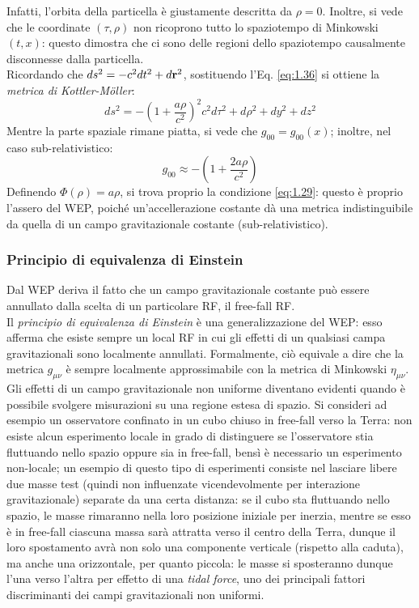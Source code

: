 Infatti, l'orbita della particella è giustamente descritta da $ \rho = 0 $. Inoltre, si vede che le coordinate $ (\tau,\rho) $ non ricoprono tutto lo spaziotempo di Minkowski $ (t,x) $: questo dimostra che ci sono delle regioni dello spaziotempo causalmente disconnesse dalla particella.\\
Ricordando che $ ds^2 = -c^2 dt^2 + d\mathbf{r}^2 $, sostituendo l'Eq. \ref{eq:1.36} si ottiene la \textit{metrica di Kottler-Möller}:
\begin{equation}
  ds^2 = - \left( 1 + \frac{a\rho}{c^2} \right)^2 c^2 d\tau^2 + d\rho^2 + dy^2 + dz^2
  \label{eq:1.37}
\end{equation}
Mentre la parte spaziale rimane piatta, si vede che $ g_{00} = g_{00} (x) $; inoltre, nel caso sub-relativistico:
\begin{equation}
  g_{00} \approx - \left( 1 + \frac{2a\rho}{c^2} \right)
  \label{eq:1.38}
\end{equation}
Definendo $ \Phi(\rho) = a\rho $, si trova proprio la condizione \ref{eq:1.29}: questo è proprio l'assero del WEP, poiché un'accellerazione costante dà una metrica indistinguibile da quella di un campo gravitazionale costante (sub-relativistico).

\subsubsection{Principio di equivalenza di Einstein}

Dal WEP deriva il fatto che un campo gravitazionale costante può essere annullato dalla scelta di un particolare RF, il free-fall RF.\\
Il \textit{principio di equivalenza di Einstein} è una generalizzazione del WEP: esso afferma che esiste sempre un local RF in cui gli effetti di un qualsiasi campa gravitazionali sono localmente annullati. Formalmente, ciò equivale a dire che la metrica $ g_{\mu \nu} $ è sempre localmente approssimabile con la metrica di Minkowski $ \eta_{\mu \nu} $.\\
Gli effetti di un campo gravitazionale non uniforme diventano evidenti quando è possibile svolgere misurazioni su una regione estesa di spazio. Si consideri ad esempio un osservatore confinato in un cubo chiuso in free-fall verso la Terra: non esiste alcun esperimento locale in grado di distinguere se l'osservatore stia fluttuando nello spazio oppure sia in free-fall, bensì è necessario un esperimento non-locale; un esempio di questo tipo di esperimenti consiste nel lasciare libere due masse test (quindi non influenzate vicendevolmente per interazione gravitazionale) separate da una certa distanza: se il cubo sta fluttuando nello spazio, le masse rimaranno nella loro posizione iniziale per inerzia, mentre se esso è in free-fall ciascuna massa sarà attratta verso il centro della Terra, dunque il loro spostamento avrà non solo una componente verticale (rispetto alla caduta), ma anche una orizzontale, per quanto piccola: le masse si sposteranno dunque l'una verso l'altra per effetto di una \textit{tidal force}, uno dei principali fattori discriminanti dei campi gravitazionali non uniformi.


